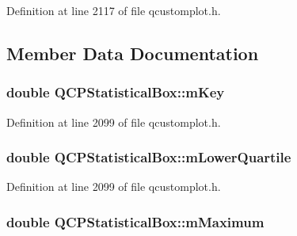 Definition at line 2117 of file qcustomplot.\-h.



\subsection{Member Data Documentation}
\hypertarget{class_q_c_p_statistical_box_a86fd1d3be5c5bc11d11eda7517069af4}{
\subsubsection[{m\-Key}]{\setlength{\rightskip}{0pt plus 5cm}double Q\-C\-P\-Statistical\-Box\-::m\-Key\hspace{0.3cm}{\ttfamily [protected]}}}\label{class_q_c_p_statistical_box_a86fd1d3be5c5bc11d11eda7517069af4}


Definition at line 2099 of file qcustomplot.\-h.

\hypertarget{class_q_c_p_statistical_box_acac86cac93d9fa3d820b5aaa04ed96f6}{
\subsubsection[{m\-Lower\-Quartile}]{\setlength{\rightskip}{0pt plus 5cm}double Q\-C\-P\-Statistical\-Box\-::m\-Lower\-Quartile\hspace{0.3cm}{\ttfamily [protected]}}}\label{class_q_c_p_statistical_box_acac86cac93d9fa3d820b5aaa04ed96f6}


Definition at line 2099 of file qcustomplot.\-h.

\hypertarget{class_q_c_p_statistical_box_a16266f1e0e4e8e95b5d141c49479ef2e}{
\subsubsection[{m\-Maximum}]{\setlength{\rightskip}{0pt plus 5cm}double Q\-C\-P\-Statistical\-Box\-::m\-Maximum\hspace{0.3cm}{\ttfamily [protected]}}}\label{class_q_c_p_statistical_box_a16266f1e0e4e8e95b5d141c49479ef2e}


